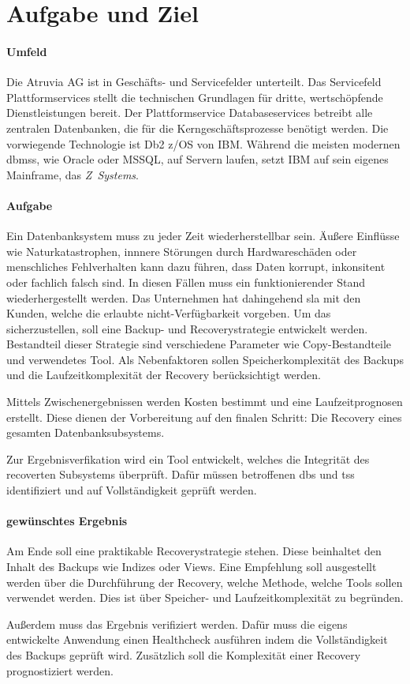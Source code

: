 \chapter{Aufgabe und Ziel}

\subsubsection{Umfeld}
Die Atruvia AG ist in Geschäfts- und Servicefelder unterteilt. Das Servicefeld Plattformservices stellt die technischen Grundlagen für dritte, wertschöpfende Dienstleistungen bereit. Der Plattformservice Databaseservices betreibt alle zentralen Datenbanken, die für die Kerngeschäftsprozesse benötigt werden. Die vorwiegende Technologie ist Db2 z/OS von IBM. Während die meisten modernen \acp{dbms}, wie Oracle oder MSSQL, auf Servern laufen, setzt IBM auf sein eigenes Mainframe, das \emph{\mbox{Z Systems}}. 

\subsubsection{Aufgabe}
Ein Datenbanksystem muss zu jeder Zeit wiederherstellbar sein. Äußere Einflüsse wie Naturkatastrophen, innnere Störungen durch Hardwareschäden oder menschliches Fehlverhalten kann dazu führen, dass Daten korrupt, inkonsitent oder fachlich falsch sind. In diesen Fällen muss ein funktionierender Stand wiederhergestellt werden. Das Unternehmen hat dahingehend \ac{sla} mit den Kunden, welche die erlaubte nicht-Verfügbarkeit vorgeben. Um das sicherzustellen, soll eine Backup- und Recoverystrategie entwickelt werden. Bestandteil dieser Strategie sind verschiedene Parameter wie Copy-Bestandteile und verwendetes Tool. Als Nebenfaktoren sollen Speicherkomplexität des Backups und die Laufzeitkomplexität der Recovery berücksichtigt werden.

Mittels Zwischenergebnissen werden Kosten bestimmt und eine Laufzeitprognosen erstellt. Diese dienen der Vorbereitung auf den finalen Schritt: Die Recovery eines gesamten Datenbanksubsystems.

Zur Ergebnisverfikation wird ein Tool entwickelt, welches die Integrität des recoverten Subsystems überprüft. Dafür müssen betroffenen \acp{db} und \acp{ts} identifiziert und auf Vollständigkeit geprüft werden.



\subsubsection{gewünschtes Ergebnis}
Am Ende soll eine praktikable Recoverystrategie stehen. Diese beinhaltet den Inhalt des Backups wie Indizes oder Views. Eine Empfehlung soll ausgestellt werden über die Durchführung der Recovery, welche Methode, welche Tools sollen verwendet werden. Dies ist über Speicher- und Laufzeitkomplexität zu begründen.

Außerdem muss das Ergebnis verifiziert werden. Dafür muss die eigens entwickelte Anwendung einen Healthcheck ausführen indem die Vollständigkeit des Backups geprüft wird. Zusätzlich soll die Komplexität einer Recovery prognostiziert werden.